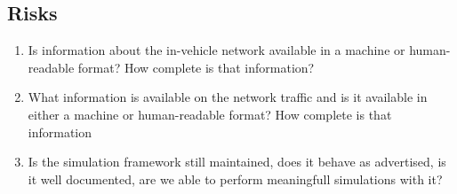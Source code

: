 \subsection{Risks}
\label{sec:researchrisks}
\begin{enumerate}
\item Is information about the in-vehicle network available in a machine or human-readable format? How complete is that information?
\item What information is available on the network traffic and is it available in either a machine or human-readable format? How complete is that information
\item Is the simulation framework \omnet still maintained, does it behave as advertised, is it well documented, are we able to perform meaningfull simulations with it?
\end{enumerate}